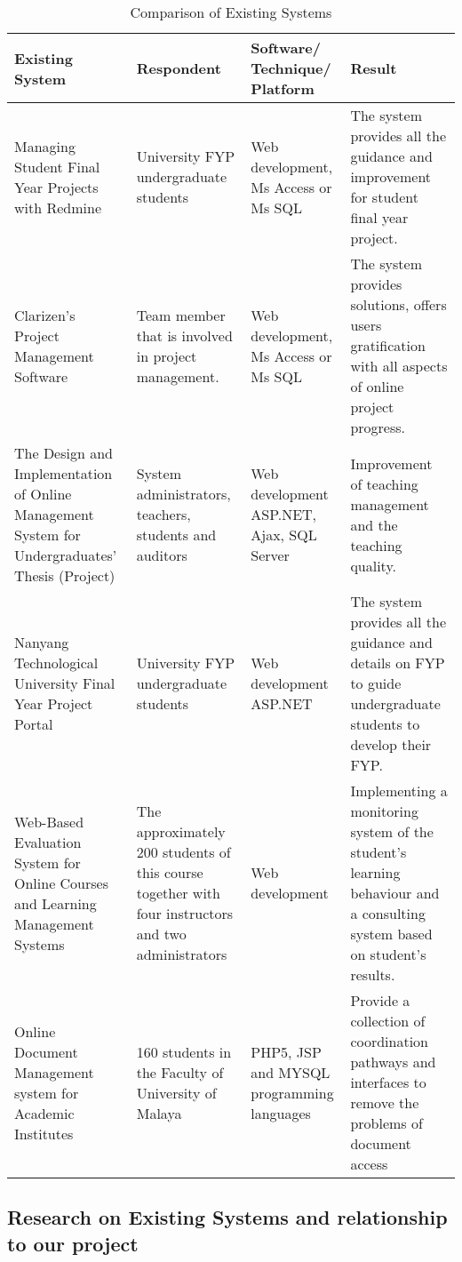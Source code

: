 \documentclass{article}
\begin{document}
\begin{table}[h!]
\centering
\begin{tabular}{ | m{3cm} | m{3cm}| m{3cm} | m{3cm} | }
\hline
\bfseries{Existing System} & \bfseries{Respondent}& \bfseries{Software/ Technique/ Platform} & \bfseries{Result} \\  
\hline
Managing Student Final Year Projects with Redmine & University FYP undergraduate students & Web development, Ms Access or Ms SQL & The system provides all the guidance and improvement for student final year project. \\ 
\hline
Clarizen's Project Management Software & Team member that is involved in project management. & Web development, Ms Access or Ms SQL& The system  provides solutions, offers users gratification with all aspects of online project progress.  \\  
\hline
The Design and Implementation of Online Management System for Undergraduates’ Thesis (Project)& System administrators, teachers, students and auditors & Web development ASP.NET, Ajax, SQL Server & Improvement of teaching management and the teaching quality. \\ 
\hline
Nanyang Technological University Final Year Project Portal & University FYP undergraduate students & Web development ASP.NET & The system provides all the guidance and details on FYP to guide undergraduate students to develop their FYP. \\ 
\hline
 Web-Based Evaluation System for Online Courses and Learning Management Systems& The approximately 200 students of this course together with four instructors and two administrators & Web development & Implementing a monitoring system of the student's learning behaviour and a consulting system based on student's results. \\ 
\hline
  Online Document Management system for Academic Institutes& 160 students in the Faculty of University of Malaya & PHP5, JSP and MYSQL programming languages & Provide a collection of coordination pathways and interfaces to remove the problems of document access \\ 
\hline
\end{tabular}
\caption{Comparison of Existing Systems}
\label{table:1}
\end{table}
\subsection{Research on Existing Systems and relationship to our project}
\end{document}
